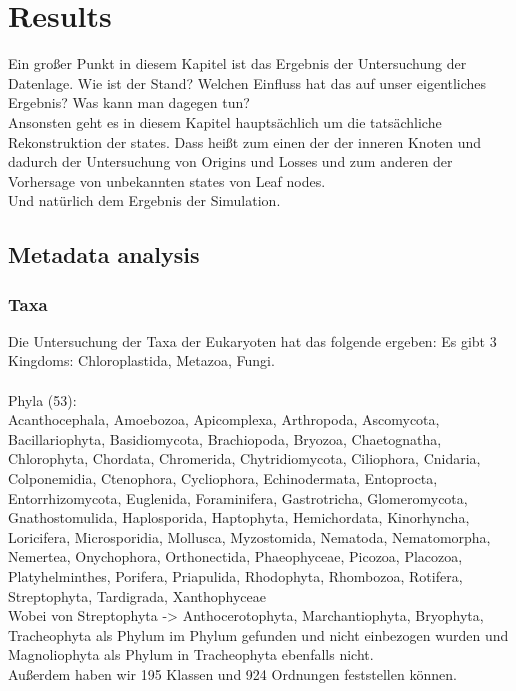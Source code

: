 \chapter{Results}
  Ein großer Punkt in diesem Kapitel ist das Ergebnis der Untersuchung der Datenlage. Wie ist der 
    Stand? Welchen Einfluss hat das auf unser eigentliches Ergebnis? Was kann man dagegen tun? \\
  Ansonsten geht es in diesem Kapitel hauptsächlich um die tatsächliche Rekonstruktion der states.
    Dass heißt zum einen der der inneren Knoten und dadurch der Untersuchung von Origins und Losses
    und zum anderen der Vorhersage von unbekannten states von Leaf nodes. \\
  Und natürlich dem Ergebnis der Simulation.

  \section{Metadata analysis}

    \subsection{Taxa}
      Die Untersuchung der Taxa der Eukaryoten hat das folgende ergeben:
      Es gibt 3 Kingdoms: Chloroplastida, Metazoa, Fungi. \\
       \\
      Phyla (53): \\
      Acanthocephala, Amoebozoa, Apicomplexa, Arthropoda, Ascomycota, Bacillariophyta, Basidiomycota, 
        Brachiopoda, Bryozoa, Chaetognatha, Chlorophyta, Chordata, Chromerida, Chytridiomycota, 
        Ciliophora, Cnidaria, Colponemidia, Ctenophora, Cycliophora, Echinodermata, Entoprocta, 
        Entorrhizomycota, Euglenida, Foraminifera, Gastrotricha, Glomeromycota, Gnathostomulida, 
        Haplosporida, Haptophyta, Hemichordata, Kinorhyncha, Loricifera, Microsporidia, Mollusca, 
        Myzostomida, Nematoda, Nematomorpha, Nemertea, Onychophora, Orthonectida, Phaeophyceae, 
        Picozoa, Placozoa, Platyhelminthes, Porifera, Priapulida, Rhodophyta, Rhombozoa, Rotifera, 
        Streptophyta, Tardigrada, Xanthophyceae \\
      Wobei von Streptophyta -> Anthocerotophyta, Marchantiophyta, Bryophyta, Tracheophyta als
        Phylum im Phylum gefunden und nicht einbezogen wurden und Magnoliophyta als Phylum in 
        Tracheophyta ebenfalls nicht. \\
      Außerdem haben wir 195 Klassen und 924 Ordnungen feststellen können.

